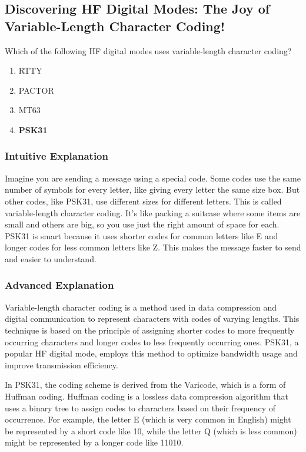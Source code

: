 \subsection{Discovering HF Digital Modes: The Joy of Variable-Length Character Coding!}

\begin{tcolorbox}[colback=gray!10!white,colframe=black!75!black,title=E2E09] Which of the following HF digital modes uses variable-length character coding?
    \begin{enumerate}[label=\Alph*.]
        \item RTTY
        \item PACTOR
        \item MT63
        \item \textbf{PSK31}
    \end{enumerate}
\end{tcolorbox}

\subsubsection{Intuitive Explanation}
Imagine you are sending a message using a special code. Some codes use the same number of symbols for every letter, like giving every letter the same size box. But other codes, like PSK31, use different sizes for different letters. This is called variable-length character coding. It’s like packing a suitcase where some items are small and others are big, so you use just the right amount of space for each. PSK31 is smart because it uses shorter codes for common letters like E and longer codes for less common letters like Z. This makes the message faster to send and easier to understand.

\subsubsection{Advanced Explanation}
Variable-length character coding is a method used in data compression and digital communication to represent characters with codes of varying lengths. This technique is based on the principle of assigning shorter codes to more frequently occurring characters and longer codes to less frequently occurring ones. PSK31, a popular HF digital mode, employs this method to optimize bandwidth usage and improve transmission efficiency.

In PSK31, the coding scheme is derived from the Varicode, which is a form of Huffman coding. Huffman coding is a lossless data compression algorithm that uses a binary tree to assign codes to characters based on their frequency of occurrence. For example, the letter E (which is very common in English) might be represented by a short code like 10, while the letter Q (which is less common) might be represented by a longer code like 11010.

